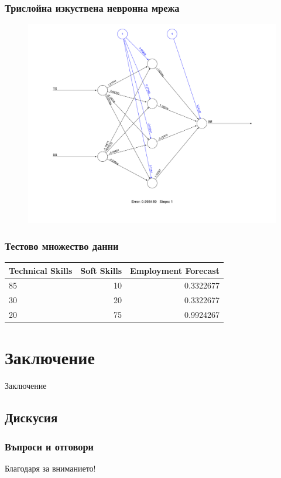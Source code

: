 \documentclass{beamer}
\begin{document}
\begin{frame}
\frametitle{Трислойна изкуствена невронна мрежа}
\begin{figure}[]\includegraphics[width=\textwidth,height=0.75\textheight]{pic0065}\end{figure}
\end{frame}

\begin{frame}
\frametitle{Тестово множество данни}
\begin{table}[ht]
\centering
\begin{tabular}{|l|r|r|} 
	\hline
	Technical Skills & Soft Skills & Employment Forecast \\
	\hline\hline
	85 & 10 & 0.3322677 \\
	\hline
	30 & 20 & 0.3322677 \\
	\hline
	20 & 75 & 0.9924267 \\
	\hline
\end{tabular}
\end{table}
\end{frame}

\section{Заключение}

\begin{frame}
\center \huge{Заключение}
\end{frame}

\subsection{Дискусия}

\begin{frame}
\frametitle{Въпроси и отговори}
\center \huge{Благодаря за вниманието!}
\end{frame}
\end{document}
